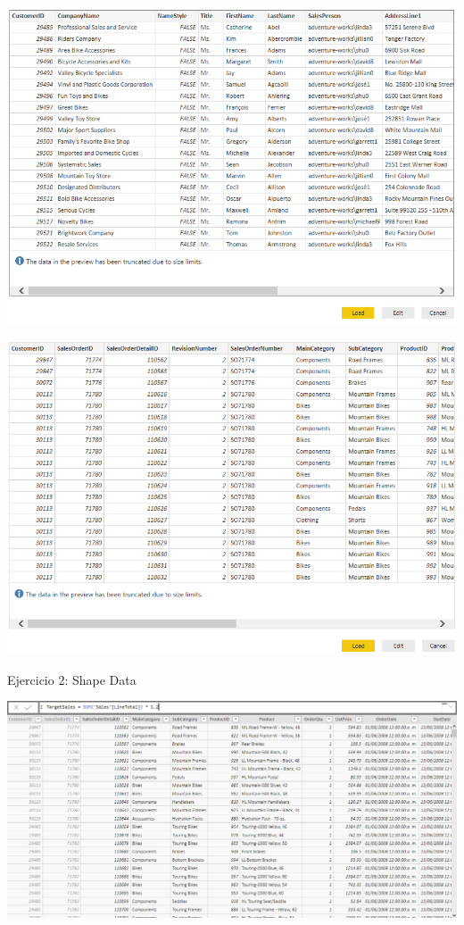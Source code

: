 	\begin{center}
	\includegraphics[width=15cm]{./Imagenes/power3}
	\end{center}	

	\begin{center}
	\includegraphics[width=15cm]{./Imagenes/power4}
	\end{center}	
\pagebreak
Ejercicio 2: Shape Data\\
	\begin{center}
	\includegraphics[width=15cm]{./Imagenes/power5}
	\end{center}	

